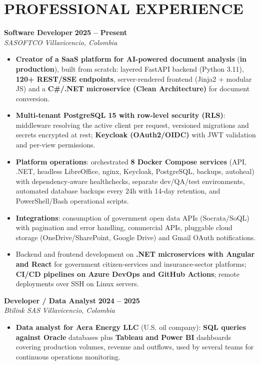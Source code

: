 \documentclass[letterpaper,10pt]{article}
\begin{document}
\section{PROFESSIONAL EXPERIENCE}

\textbf{Software Developer} \hfill \textbf{2025 -- Present} \\
\textit{SASOFTCO} \hfill \textit{Villavicencio, Colombia}
\begin{itemize}
    \item \textbf{Creator of a SaaS platform for AI-powered document analysis} (\textbf{in production}), built from scratch: layered FastAPI backend (Python 3.11), \textbf{120+ REST/SSE endpoints}, server-rendered frontend (Jinja2 + modular JS) and a \textbf{C\#/.NET microservice (Clean Architecture)} for document conversion.
    \item \textbf{Multi-tenant PostgreSQL 15 with row-level security (RLS)}: middleware resolving the active client per request, versioned migrations and secrets encrypted at rest; \textbf{Keycloak (OAuth2/OIDC)} with JWT validation and per-view permissions.
    \item \textbf{Platform operations}: orchestrated \textbf{8 Docker Compose services} (API, .NET, headless LibreOffice, nginx, Keycloak, PostgreSQL, backups, autoheal) with dependency-aware healthchecks, separate dev/QA/test environments, automated database backups every 24h with 14-day retention, and PowerShell/Bash operational scripts.
    \item \textbf{Integrations}: consumption of government open data APIs (Socrata/SoQL) with pagination and error handling, commercial APIs, pluggable cloud storage (OneDrive/SharePoint, Google Drive) and Gmail OAuth notifications.
    \item Backend and frontend development on \textbf{.NET microservices with Angular and React} for government citizen-services and insurance-sector platforms; \textbf{CI/CD pipelines on Azure DevOps and GitHub Actions}; remote deployments over SSH on Linux servers.
\end{itemize}

\textbf{Developer / Data Analyst} \hfill \textbf{2024 -- 2025} \\
\textit{Btilink SAS} \hfill \textit{Villavicencio, Colombia}
\begin{itemize}
    \item \textbf{Data analyst for Aera Energy LLC} (U.S. oil company): \textbf{SQL queries against Oracle} databases plus \textbf{Tableau and Power BI} dashboards covering production volumes, revenue and outflows, used by several teams for continuous operations monitoring.
\end{itemize}
\end{document}
